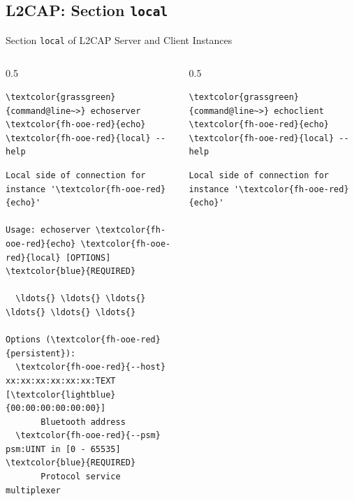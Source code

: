 \subsection{L2CAP: Section \textcolor{fh-ooe-red}{\lstinline|local|}}

\begin{frame}[fragile]{Section \alert{\lstinline|local|} of L2CAP Server and Client Instances}
\begin{columns}[T, onlytextwidth]
\begin{column}{0.5\textwidth}
\begin{scriptsize}
\begin{Verbatim}[commandchars=\\\{\}]
\textcolor{grassgreen}{command@line~>} echoserver \textcolor{fh-ooe-red}{echo} \textcolor{fh-ooe-red}{local} --help
\end{Verbatim}
\begin{Verbatim}[commandchars=\\\{\},frame=leftline,rulecolor=\color{fh-ooe-red}]
Local side of connection for instance '\textcolor{fh-ooe-red}{echo}'

Usage: echoserver \textcolor{fh-ooe-red}{echo} \textcolor{fh-ooe-red}{local} [OPTIONS] \textcolor{blue}{REQUIRED}

  \ldots{} \ldots{} \ldots{} \ldots{} \ldots{} \ldots{}

Options (\textcolor{fh-ooe-red}{persistent}):
  \textcolor{fh-ooe-red}{--host} xx:xx:xx:xx:xx:xx:TEXT [\textcolor{lightblue}{00:00:00:00:00:00}]
       Bluetooth address
  \textcolor{fh-ooe-red}{--psm} psm:UINT in [0 - 65535] \textcolor{blue}{REQUIRED}
       Protocol service multiplexer
\end{Verbatim}
\end{scriptsize}
\end{column}
\hspace{-0.33cm}\begin{column}{0.5\textwidth}
\begin{scriptsize}
\begin{Verbatim}[commandchars=\\\{\}]
\textcolor{grassgreen}{command@line~>} echoclient \textcolor{fh-ooe-red}{echo} \textcolor{fh-ooe-red}{local} --help
\end{Verbatim}
\begin{Verbatim}[commandchars=\\\{\},frame=leftline,rulecolor=\color{fh-ooe-red}]
Local side of connection for instance '\textcolor{fh-ooe-red}{echo}'


\end{Verbatim}
\end{scriptsize}
\end{column}
\end{columns}
\end{frame}
